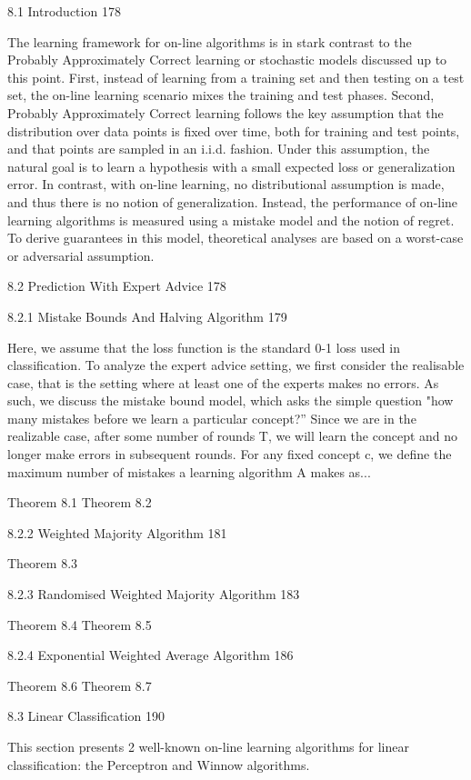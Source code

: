 8.1 Introduction 178

The learning framework for on-line algorithms is in stark contrast to the Probably Approximately Correct learning or stochastic models discussed up to this point. First, instead of learning from a training set and then testing on a test set, the on-line learning scenario mixes the training and test phases. Second, Probably Approximately Correct learning follows the key assumption that the distribution over data points is fixed over time, both for training and test points, and that points are sampled in an i.i.d. fashion. Under this assumption, the natural goal is to learn a hypothesis with a small expected loss or generalization error. In contrast, with on-line learning, no distributional assumption is made, and thus there is no notion of generalization. Instead, the performance of on-line learning algorithms is measured using a mistake model and the notion of regret. To derive guarantees in this model, theoretical analyses are based on a worst-case or adversarial assumption.

8.2 Prediction With Expert Advice 178



8.2.1 Mistake Bounds And Halving Algorithm 179

Here, we assume that the loss function is the standard 0-1 loss used in classification. To analyze the expert advice setting, we first consider the realisable case, that is the setting where at least one of the experts makes no errors. As such, we discuss the mistake bound model, which asks the simple question "how many mistakes before we learn a particular concept?” Since we are in the realizable case, after some number of rounds T, we will learn the concept and no longer make errors in subsequent rounds. For any fixed concept c, we define the maximum number of mistakes a learning algorithm A makes as...

Theorem 8.1
Theorem 8.2

8.2.2 Weighted Majority Algorithm 181

Theorem 8.3

8.2.3 Randomised Weighted Majority Algorithm 183

Theorem 8.4
Theorem 8.5

8.2.4 Exponential Weighted Average Algorithm 186

Theorem 8.6
Theorem 8.7

8.3 Linear Classification 190

This section presents 2 well-known on-line learning algorithms for linear classification: the Perceptron and Winnow algorithms.

